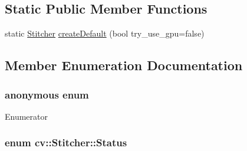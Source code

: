 \subsection*{Static Public Member Functions}
\begin{DoxyCompactItemize}
\item 
static \hyperlink{classcv_1_1Stitcher}{Stitcher} \hyperlink{classcv_1_1Stitcher_a6c2bc426c1f6ae0bcb45d8f8aa501b6b}{create\-Default} (bool try\-\_\-use\-\_\-gpu=false)
\end{DoxyCompactItemize}


\subsection{Member Enumeration Documentation}
\hypertarget{classcv_1_1Stitcher_a0cc01cd199e4ca1b96c6ba0d2c7137ff}{\subsubsection[{anonymous enum}]{\setlength{\rightskip}{0pt plus 5cm}anonymous enum}}\label{classcv_1_1Stitcher_a0cc01cd199e4ca1b96c6ba0d2c7137ff}
\begin{Desc}
\item[Enumerator]\par
\begin{description}
\item[{\em 
\hypertarget{classcv_1_1Stitcher_a0cc01cd199e4ca1b96c6ba0d2c7137ffac77eedc34a400551e89e12818f8bec63}{O\-R\-I\-G\-\_\-\-R\-E\-S\-O\-L}\label{classcv_1_1Stitcher_a0cc01cd199e4ca1b96c6ba0d2c7137ffac77eedc34a400551e89e12818f8bec63}
}]\end{description}
\end{Desc}
\hypertarget{classcv_1_1Stitcher_a507409ce9435dd89857469d12ec06b45}{
\subsubsection[{Status}]{\setlength{\rightskip}{0pt plus 5cm}enum {\bf cv\-::\-Stitcher\-::\-Status}}}\label{classcv_1_1Stitcher_a507409ce9435dd89857469d12ec06b45}
